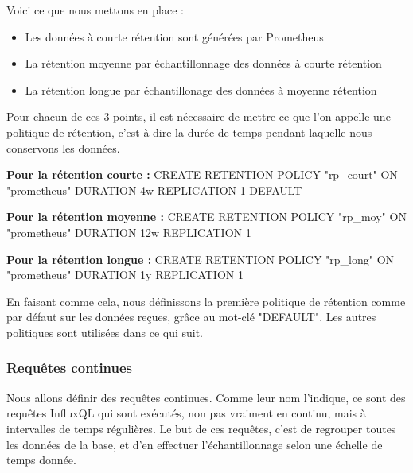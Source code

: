 \documentclass[oneside,12pt]{report}
\begin{document}
Voici ce que nous mettons en place :
\begin{itemize}
\item Les données à courte rétention sont générées par Prometheus
\item La rétention moyenne par échantillonnage  des données à courte rétention
\item La rétention longue par échantillonage des données à moyenne rétention
\end{itemize}

\newline
Pour chacun de ces 3 points, il est nécessaire de mettre ce que l'on appelle une politique de rétention, c'est-à-dire la durée de temps pendant laquelle nous conservons les données. \newline

\textbf{Pour la rétention courte :}\newline
{\fontsize{9}{10}\selectfont CREATE RETENTION POLICY "rp\_court" ON "prometheus" DURATION 4w REPLICATION 1 DEFAULT}\newline

\textbf{Pour la rétention moyenne :}\newline
{\fontsize{9}{10}\selectfont CREATE RETENTION POLICY "rp\_moy" ON "prometheus" DURATION 12w REPLICATION 1}\newline

\textbf{Pour la rétention longue :}\newline
{\fontsize{9}{10}\selectfont CREATE RETENTION POLICY "rp\_long" ON "prometheus" DURATION 1y REPLICATION 1}\newline

En faisant comme cela, nous définissons la première politique de rétention comme par défaut sur les données reçues, grâce au mot-clé "DEFAULT". Les autres politiques sont utilisées dans ce qui suit.

\subsubsection{Requêtes continues}

Nous allons définir des requêtes continues. Comme leur nom l'indique, ce sont des requêtes InfluxQL qui sont exécutés, non pas vraiment en continu, mais à intervalles de temps régulières. Le but de ces requêtes, c'est de regrouper toutes les données de la base, et d'en effectuer l'échantillonnage selon une échelle de temps donnée. \newline
\end{document}
